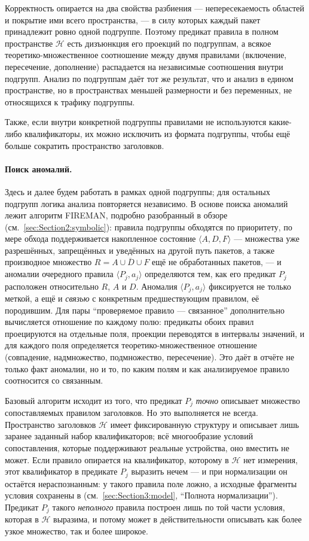 Корректность опирается на два свойства разбиения --- непересекаемость областей и покрытие ими всего пространства, --- в силу которых каждый пакет принадлежит ровно одной подгруппе. Поэтому предикат правила в полном пространстве $\mathcal{H}$ есть дизъюнкция его проекций по подгруппам, а всякое теоретико-множественное соотношение между двумя правилами (включение, пересечение, дополнение) распадается на независимые соотношения внутри подгрупп. Анализ по подгруппам даёт тот же результат, что и анализ в едином пространстве, но в пространствах меньшей размерности и без переменных, не относящихся к трафику подгруппы.

Также, если внутри конкретной подгруппы правилами не используются какие-либо квалификаторы, их можно исключить из формата подгруппы, чтобы ещё больше сократить пространство заголовков.

\paragraph{Поиск аномалий.} Здесь и далее будем работать в рамках одной подгруппы; для остальных подгрупп логика анализа повторяется независимо. В основе поиска аномалий лежит алгоритм FIREMAN, подробно разобранный в обзоре (см.~\ref{sec:Section2:symbolic}): правила подгруппы обходятся по приоритету, по мере обхода поддерживается накопленное состояние $\langle A, D, F\rangle$ --- множества уже разрешённых, запрещённых и уведённых на другой путь пакетов, а также производное множество $R = \overline{A \cup D \cup F}$ ещё не обработанных пакетов, --- и аномалии очередного правила $\langle P_j, a_j\rangle$ определяются тем, как его предикат $P_j$ расположен относительно $R$, $A$ и $D$. Аномалия $\langle P_j, a_j\rangle$ фиксируется не только меткой, а ещё и \emph{связью} с конкретным предшествующим правилом, её породившим. Для пары ``проверяемое правило --- связанное'' дополнительно вычисляется отношение по каждому полю: предикаты обоих правил проецируются на отдельные поля, проекции переводятся в интервалы значений, и для каждого поля определяется теоретико-множественное отношение (совпадение, надмножество, подмножество, пересечение). Это даёт в отчёте не только факт аномалии, но и то, по каким полям и как анализируемое правило соотносится со связанным.

Базовый алгоритм исходит из того, что предикат $P_j$ \emph{точно} описывает множество сопоставляемых правилом заголовков. Но это выполняется не всегда. Пространство заголовков $\mathcal{H}$ имеет фиксированную структуру и описывает лишь заранее заданный набор квалификаторов; всё многообразие условий сопоставления, которые поддерживают реальные устройства, оно вместить не может. Если правило опирается на квалификатор, которому в $\mathcal{H}$ нет измерения, этот квалификатор в предикате $P_j$ выразить нечем --- и при нормализации он остаётся нераспознанным: у такого правила поле  ложно, а исходные фрагменты условия сохранены в  (см.~\ref{sec:Section3:model}, ``Полнота нормализации''). Предикат $P_j$ такого \emph{неполного} правила построен лишь по той части условия, которая в $\mathcal{H}$ выразима, и потому может в действительности описывать как более узкое множество, так и более широкое.

